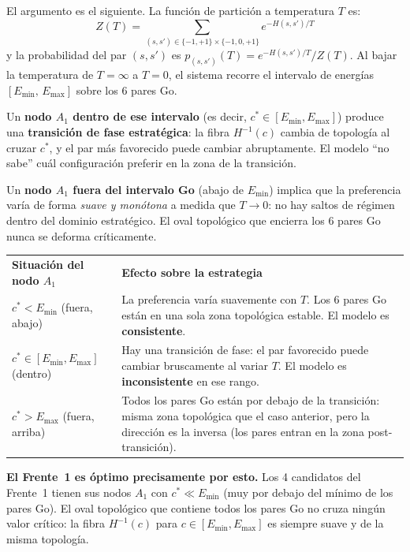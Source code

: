 \documentclass[11pt, a4paper]{article}
\newcommand{\TH}[1]{\cellcolor{cTHbg}\color{white}\textbf{#1}}
\begin{document}
El argumento es el siguiente. La funci\'on de partici\'on a temperatura $T$ es:
\[
  Z(T) = \sum_{(s,s')\in\{-1,+1\}\times\{-1,0,+1\}}
         e^{-H(s,s')/T}
\]
y la probabilidad del par $(s,s')$ es $p_{(s,s')}(T) = e^{-H(s,s')/T}/Z(T)$.
Al bajar la temperatura de $T=\infty$ a $T=0$, el sistema recorre el
intervalo de energ\'ias $[E_{\min},\, E_{\max}]$ sobre los 6 pares Go.

Un \textbf{nodo $A_1$ dentro de ese intervalo} (es decir, $c^*\in[E_{\min},E_{\max}]$)
produce una \textbf{transici\'on de fase estrat\'egica}: la fibra $H^{-1}(c)$
cambia de topolog\'ia al cruzar $c^*$, y el par m\'as favorecido puede cambiar
abruptamente. El modelo ``no sabe'' cu\'al configuraci\'on preferir en la zona
de la transici\'on.

Un \textbf{nodo $A_1$ fuera del intervalo Go} (abajo de $E_{\min}$) implica
que la preferencia varía de forma \emph{suave y mon\'otona} a medida que $T\to 0$:
no hay saltos de r\'egimen dentro del dominio estrat\'egico. El oval topol\'ogico
que encierra los 6 pares Go nunca se deforma cr\'iticamente.

\medskip
\begin{center}
\begin{tabularx}{0.96\textwidth}{L{3.8cm}X}
  \TH{Situaci\'on del nodo $A_1$} & \TH{Efecto sobre la estrategia} \\[1pt]
  $c^* < E_{\min}$ (fuera, abajo)
    & La preferencia varía suavemente con $T$.
      Los 6 pares Go est\'an en una sola zona topol\'ogica estable.
      El modelo es \textbf{consistente}. \\
  $c^* \in [E_{\min}, E_{\max}]$ (dentro)
    & Hay una transici\'on de fase: el par favorecido puede cambiar
      bruscamente al variar $T$. El modelo es \textbf{inconsistente}
      en ese rango. \\
  $c^* > E_{\max}$ (fuera, arriba)
    & Todos los pares Go est\'an por debajo de la transici\'on:
      misma zona topol\'ogica que el caso anterior, pero la direcci\'on
      es la inversa (los pares entran en la zona post-transici\'on). \\
\end{tabularx}
\end{center}
\medskip

\textbf{El Frente~1 es \'optimo precisamente por esto.}
Los 4 candidatos del Frente~1 tienen sus nodos $A_1$ con
$c^*\ll E_{\min}$ (muy por debajo del m\'inimo de los pares Go).
El oval topol\'ogico que contiene todos los pares Go no cruza ning\'un
valor cr\'itico: la fibra $H^{-1}(c)$ para $c\in[E_{\min},E_{\max}]$
es siempre suave y de la misma topolog\'ia.
\end{document}
